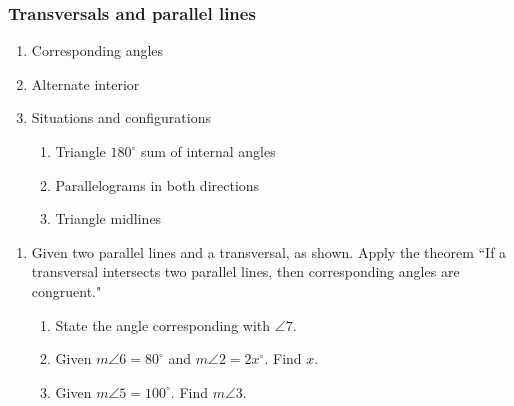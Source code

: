 \documentclass[12pt, oneside]{article}
\begin{document}
\subsubsection*{Transversals and parallel lines}
  \begin{enumerate}
  \item Corresponding angles
  \item Alternate interior
  \item Situations and configurations
  \begin{enumerate}
    \item Triangle $180^\circ$ sum of internal angles
    \item Parallelograms in both directions
    \item Triangle midlines
    \end{enumerate}
  \end{enumerate}

  \begin{enumerate}
    \subsubsection*{Corresponding angles}
    \item Given two parallel lines and a transversal, as shown. Apply the theorem ``If a transversal intersects two parallel lines, then corresponding angles are congruent."
    \begin{center}
    \end{center}
      \begin{enumerate}
        \item State the angle corresponding with $\angle 7$. \bigskip
        \item Given $m\angle 6 = 80^\circ$ and $m\angle 2 = 2x^\circ$. Find $x$. \bigskip
        \item Given $m\angle 5 = 100^\circ$. Find $m\angle 3$.
      \end{enumerate}


  \end{enumerate}
\end{document}
